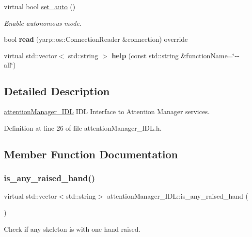 \begin{DoxyCompactItemize}
virtual bool \mbox{\hyperlink{classattentionManager__IDL_a3c0c61fdb996d2b7378c02e6225a6c20}{set\+\_\+auto}} ()
\begin{DoxyCompactList}\small\item\em Enable autonomous mode. \end{DoxyCompactList}\item 
\mbox{\label{classattentionManager__IDL_ab7ca0482a77f24b49fa05448fb32ba54}} 
bool {\bfseries read} (yarp\+::os\+::\+Connection\+Reader \&connection) override
\item 
\mbox{\label{classattentionManager__IDL_ac3c162b2616ec83ecb6f605d79c7b6af}} 
virtual std\+::vector$<$ std\+::string $>$ {\bfseries help} (const std\+::string \&function\+Name=\char`\"{}-\/-\/all\char`\"{})
\end{DoxyCompactItemize}


\subsection{Detailed Description}
\mbox{\hyperlink{classattentionManager__IDL}{attention\+Manager\+\_\+\+I\+DL}} I\+DL Interface to Attention Manager services. 

Definition at line 26 of file attention\+Manager\+\_\+\+I\+D\+L.\+h.



\subsection{Member Function Documentation}
\mbox{\label{classattentionManager__IDL_ad0b7882cea4dd8b0269cd3eaf0f5dbae}} 
\subsubsection{\texorpdfstring{is\_any\_raised\_hand()}{is\_any\_raised\_hand()}}
{\footnotesize\ttfamily virtual std\+::vector$<$std\+::string$>$ attention\+Manager\+\_\+\+I\+D\+L\+::is\+\_\+any\+\_\+raised\+\_\+hand (\begin{DoxyParamCaption}{ }\end{DoxyParamCaption})\hspace{0.3cm}{\ttfamily [virtual]}}



Check if any skeleton is with one hand raised. 


